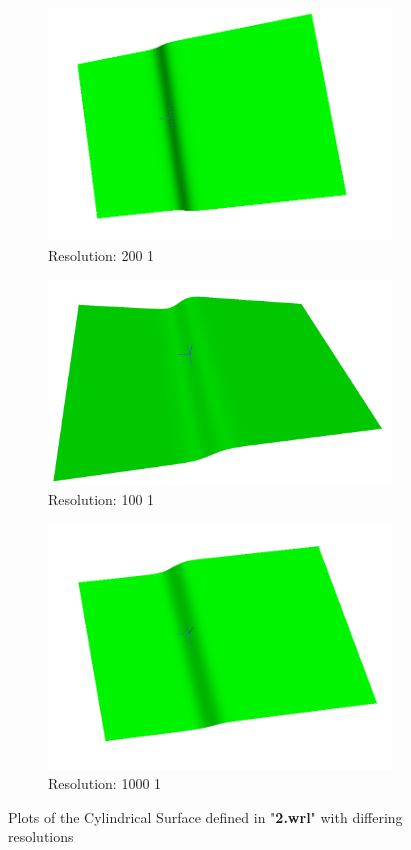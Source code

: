 \documentclass[acmlarge,nonacm=true]{acmart}
\begin{document}
\begin{figure}[H]
	\begin{subfigure}{.33\textwidth}
	  \centering
	  \includegraphics[width=.8\linewidth]{fig/2_200_1}
	  \caption{Resolution: 200 1}
	\end{subfigure}%
	\begin{subfigure}{.33\textwidth}
	  \centering
	  \includegraphics[width=.8\linewidth]{fig/2_100_1}
	  \caption{Resolution: 100 1}
	\end{subfigure}
	\begin{subfigure}{.33\textwidth}
		\centering
		\includegraphics[width=.8\linewidth]{fig/2_1000_1}
		\caption{Resolution: 1000 1}
	  \end{subfigure}
	\caption{Plots of the Cylindrical Surface defined in "\textbf{2.wrl}" with differing resolutions}
	\label{fig:2}
\end{figure}
\end{document}
